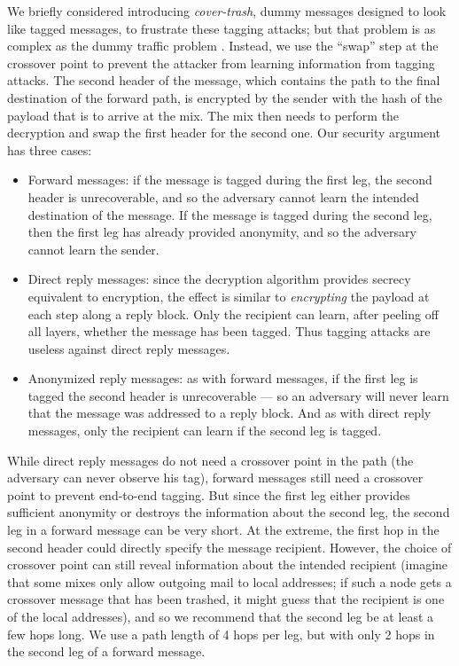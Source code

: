 \documentclass[final,inpress,inline]{ieee}
\begin{document}
We briefly considered introducing \emph{cover-trash}, dummy messages
designed to look like tagged messages, to frustrate
these tagging attacks; but that problem is as complex as the dummy
traffic problem \cite{langos02}. Instead, we use the
``swap'' step at the
crossover point to prevent the attacker from learning information from
tagging attacks. The second header of the message, which contains the
path to the final destination of the forward path, is encrypted by the
sender with the hash of the payload that is to arrive at the mix. The
mix then needs to perform the decryption and swap the first header for
the second one.
Our security argument has three cases:

\begin{itemize}
\item Forward messages: if the message is tagged during the first leg,
the second header is unrecoverable, and so the adversary cannot
learn the intended destination of the message. If the message is tagged
during the second leg, then the first leg has already provided anonymity,
and so the adversary cannot learn the sender.
\item Direct reply messages: since the decryption algorithm provides
secrecy equivalent to encryption, the effect is similar to {\em encrypting}
the payload at each step along a reply block. Only the recipient can learn,
after peeling off all layers, whether the message has been tagged. Thus
tagging attacks are useless against direct reply messages.
\item Anonymized reply messages: as with forward messages, if the first leg
is tagged the second header is unrecoverable --- so an adversary will
never learn that the message was addressed to a reply block. And as with
direct reply messages, only the recipient can learn if the second leg is
tagged.
\end{itemize}

While direct reply messages do not need a crossover point in the path
(the adversary can never observe his tag), forward messages still need a
crossover point to prevent end-to-end tagging. But since the first leg
either provides sufficient anonymity or destroys the information about
the second leg, the second leg in a forward message can be very short.
At the extreme, the first hop in the second header could directly
specify the message recipient. However, the choice of crossover point
can still reveal information about the intended recipient (imagine that
some mixes only allow outgoing mail to local addresses; if such a
node gets a crossover message that has been trashed, it might guess
that the recipient is one of the local addresses), and so we recommend
that the second leg be at least a few hops long.
We use a path length of 4 hops per leg, but with only 2 hops in the
second leg of a forward message.
\end{document}
